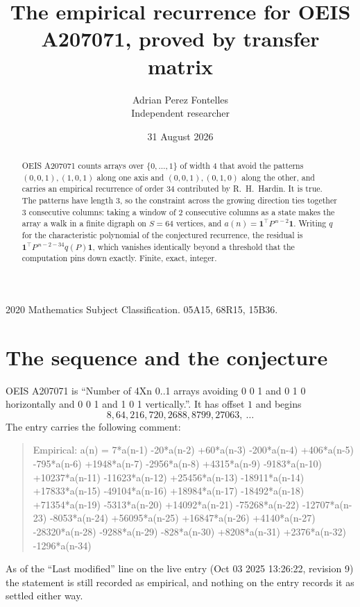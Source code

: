 \documentclass[11pt,a4paper]{article}
\title{The empirical recurrence for OEIS A207071, proved by transfer matrix}
\author{Adrian Perez Fontelles\\ \small Independent researcher}
\date{31 August 2026}
\theoremstyle{plain}
\theoremstyle{definition}
\begin{document}
\maketitle

\begin{abstract}
OEIS A207071 counts arrays over $\{0,\dots,1\}$ of width $4$ that avoid the patterns
$(0,0,1), (1,0,1)$ along one axis and $(0,0,1), (0,1,0)$ along the other, and carries an empirical recurrence of
order $34$ contributed by R.~H.~Hardin. It is true. The patterns have length $3$, so
the constraint across the growing direction ties together $3$ consecutive columns: taking a
window of $2$ consecutive columns as a state makes the array a walk in a finite digraph
on $S=64$ vertices, and $a(n)=\mathbf{1}^{\!\top}P^{\,n-2}\mathbf{1}$. Writing $q$
for the characteristic polynomial of the conjectured recurrence, the residual is
$\mathbf{1}^{\!\top}P^{\,n-2-34}q(P)\mathbf{1}$, which vanishes identically
beyond a threshold that the computation pins down exactly. Finite, exact, integer.
\end{abstract}

\noindent\small 2020 Mathematics Subject Classification. 05A15, 68R15, 15B36.\normalsize

\section{The sequence and the conjecture}

OEIS A207071 is ``Number of 4Xn 0..1 arrays avoiding 0 0 1 and 0 1 0 horizontally and 0 0 1 and 1 0 1 vertically.''. It has offset
$1$ and begins
\[
8, 64, 216, 720, 2688, 8799, 27063,\ \dots
\]
The entry carries the following comment:
\begin{quote}\small
Empirical: a(n) = 7*a(n-1) -20*a(n-2) +60*a(n-3) -200*a(n-4) +406*a(n-5) -795*a(n-6) +1948*a(n-7) -2956*a(n-8) +4315*a(n-9) -9183*a(n-10) +10237*a(n-11) -11623*a(n-12) +25456*a(n-13) -18911*a(n-14) +17833*a(n-15) -49104*a(n-16) +18984*a(n-17) -18492*a(n-18) +71354*a(n-19) -5313*a(n-20) +14092*a(n-21) -75268*a(n-22) -12707*a(n-23) -8053*a(n-24) +56095*a(n-25) +16847*a(n-26) +4140*a(n-27) -28320*a(n-28) -9288*a(n-29) -828*a(n-30) +8208*a(n-31) +2376*a(n-32) -1296*a(n-34)
\end{quote}
As of the ``Last modified'' line on the live entry (Oct 03 2025 13:26:22, revision
9) the statement is still recorded as empirical, and nothing on the entry
records it as settled either way.
\end{document}
